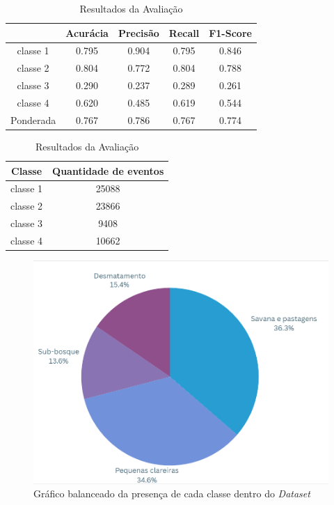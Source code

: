 \begin{table}[h]
    \centering
    \begin{tabular}{|c|c|c|c|c|}
        \hline
        & Acurácia & Precisão & Recall & F1-Score \\
        \hline
        classe 1 & 0.795 & 0.904 & 0.795 & 0.846 \\
        classe 2 & 0.804 & 0.772 & 0.804 & 0.788 \\
        classe 3 & 0.290 & 0.237 & 0.289 & 0.261 \\
        classe 4 & 0.620 & 0.485 & 0.619 & 0.544 \\
        \hline
        Ponderada & 0.767 & 0.786 & 0.767 & 0.774 \\
        \hline
    \end{tabular}


    \vspace{10pt}
    
    \begin{tabular}{|c|c|}
        \hline
        Classe & Quantidade de eventos \\
        \hline
        classe 1 & 25088 \\
        classe 2 & 23866 \\
        classe 3 & 9408 \\
        classe 4 & 10662 \\
        \hline
    \end{tabular}
    \caption{Resultados da Avaliação}
    \label{tab:resultados2}
\end{table}

\begin{figure}[H]
	\centering
	\begin{minipage}{0.9\linewidth}
		\centering
		\includegraphics[scale=0.6]{tg1/figuras/balanceado_pie.png}
		\caption{Gráfico balanceado da presença de cada classe dentro do \textit{Dataset}} \label{fig:lstm_com_balanc}
	\end{minipage}
\end{figure}


